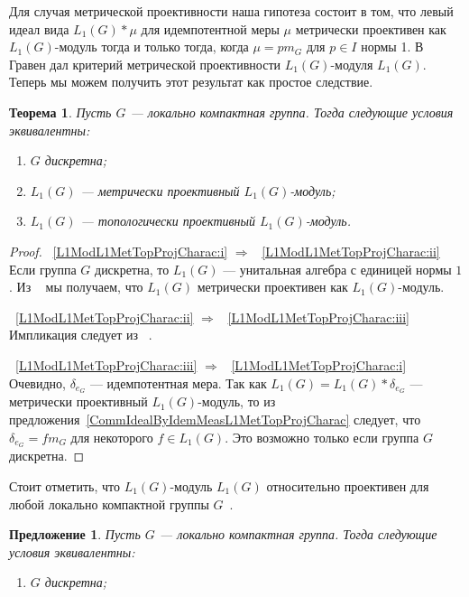 \documentclass{article}
\numberwithin{equation}{section}
\theoremstyle{plain}
\newtheorem{theorem}{Теорема}
\newtheorem{propos}{Предложение}
\theoremstyle{definition}
\newtheorem{proof}{Доказательство}\def\theproof{}
\newcommand{\convol}{\ast}
\begin{document}
\begin{fulltext}
Для случая метрической проективности наша гипотеза состоит в том, что левый
идеал вида $L_1(G)\convol \mu$ для идемпотентной меры $\mu$ метрически
проективен как $L_1(G)$-модуль тогда и только тогда, когда $\mu=p m_G$ для $p\in
I$ нормы 1. В~\cite{GravInjProjBanMod} Гравен дал критерий метрической
проективности $L_1(G)$-модуля $L_1(G)$. Теперь мы можем получить этот результат
как простое следствие.

\begin{theorem}\label{L1ModL1MetTopProjCharac} Пусть $G$ --- локально компактная
группа. Тогда следующие условия эквивалентны:
\begin{enumerate}[label = (\roman*)]
    \item $G$ дискретна;\label{L1ModL1MetTopProjCharac:i}
    
	\item $L_1(G)$ --- метрически проективный
	$L_1(G)$-модуль;\label{L1ModL1MetTopProjCharac:ii}
 
	\item $L_1(G)$ --- топологически проективный
	$L_1(G)$-модуль.\label{L1ModL1MetTopProjCharac:iii}
\end{enumerate}
\end{theorem}
\begin{proof}~\ref{L1ModL1MetTopProjCharac:i} $\Longrightarrow$
~\ref{L1ModL1MetTopProjCharac:ii} Если группа $G$ дискретна, то $L_1(G)$ ---
унитальная алгебра с единицей нормы $1$. Из
~\cite[предложение~7]{NemMetTopProjIdBanAlg} мы получаем, что $L_1(G)$
метрически проективен как $L_1(G)$-модуль.

~\ref{L1ModL1MetTopProjCharac:ii} $\Longrightarrow$
~\ref{L1ModL1MetTopProjCharac:iii} Импликация следует из
~\cite[предложение~2.4]{NemGeomProjInjFlatBanMod}.

~\ref{L1ModL1MetTopProjCharac:iii} $\Longrightarrow$
~\ref{L1ModL1MetTopProjCharac:i} Очевидно, $\delta_{e_G}$ --- идемпотентная
мера. Так как $L_1(G)=L_1(G)\convol \delta_{e_G}$ --- метрически проективный
$L_1(G)$-модуль, то из предложения~\ref{CommIdealByIdemMeasL1MetTopProjCharac}
следует, что $\delta_{e_G}=f m_G$ для некоторого $f\in L_1(G)$. Это возможно
только если группа $G$ дискретна.
\end{proof}

Стоит отметить, что $L_1(G)$-модуль $L_1(G)$ относительно проективен для любой
локально компактной группы $G$~\cite[упражнение~7.1.17]{HelBanLocConvAlg}.

\begin{propos}\label{L1MetTopProjAndMetrFlatOfMeasAlg} Пусть $G$ --- локально
компактная группа. Тогда следующие условия эквивалентны:
\begin{enumerate}[label = (\roman*)]
    \item $G$ дискретна;\label{L1MetTopProjAndMetrFlatOfMeasAlg:i}
    

\end{enumerate}
\end{propos}
\end{fulltext}
\end{document}

